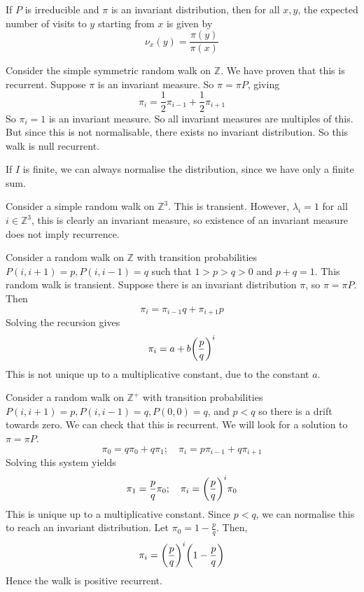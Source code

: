\begin{corollary}
	If \( P \) is irreducible and \( \pi \) is an invariant distribution, then for all \( x,y \), the expected number of visits to \( y \) starting from \( x \) is given by
	\[
		\nu_x(y) = \frac{\pi(y)}{\pi(x)}
	\]
\end{corollary}
\begin{example}
	Consider the simple symmetric random walk on \( \mathbb Z \).
	We have proven that this is recurrent.
	Suppose \( \pi \) is an invariant measure.
	So \( \pi = \pi P \), giving
	\[
		\pi_i = \frac{1}{2} \pi_{i-1} + \frac{1}{2} \pi_{i+1}
	\]
	So \( \pi_i = 1 \) is an invariant measure.
	So all invariant measures are multiples of this.
	But since this is not normalisable, there exists no invariant distribution.
	So this walk is null recurrent.
\end{example}
\begin{remark}
	If \( I \) is finite, we can always normalise the distribution, since we have only a finite sum.
\end{remark}
\begin{remark}
	Consider a simple random walk on \( \mathbb Z^3 \).
	This is transient.
	However, \( \lambda_i = 1 \) for all \( i \in \mathbb Z^3 \), this is clearly an invariant measure, so existence of an invariant measure does not imply recurrence.
\end{remark}
\begin{example}
	Consider a random walk on \( \mathbb Z \) with transition probabilities \( P(i, i+1) = p, P(i, i-1) = q \) such that \( 1 > p > q > 0 \) and \( p + q = 1 \).
	This random walk is transient.
	Suppose there is an invariant distribution \( \pi \), so \( \pi = \pi P \).
	Then
	\[
		\pi_i = \pi_{i-1} q + \pi_{i+1} p
	\]
	Solving the recursion gives
	\[
		\pi_i = a + b \qty(\frac{p}{q})^i
	\]
	This is not unique up to a multiplicative constant, due to the constant \( a \).
\end{example}
\begin{example}
	Consider a random walk on \( \mathbb Z^+ \) with transition probabilities \( P(i, i+1) = p, P(i, i-1) = q, P(0, 0) = q \), and \( p < q \) so there is a drift towards zero.
	We can check that this is recurrent.
	We will look for a solution to \( \pi = \pi P \).
	\[
		\pi_0 = q \pi_0 + q \pi_1;\quad \pi_i = p \pi_{i-1} + q \pi_{i+1}
	\]
	Solving this system yields
	\[
		\pi_1 = \frac{p}{q} \pi_0;\quad \pi_i = \qty(\frac{p}{q})^i \pi_0
	\]
	This is unique up to a multiplicative constant.
	Since \( p < q \), we can normalise this to reach an invariant distribution.
	Let \( \pi_0 = 1 - \frac{p}{q} \).
	Then,
	\[
		\pi_i = \qty(\frac{p}{q})^i \qty(1 - \frac{p}{q})
	\]
	Hence the walk is positive recurrent.
\end{example}

